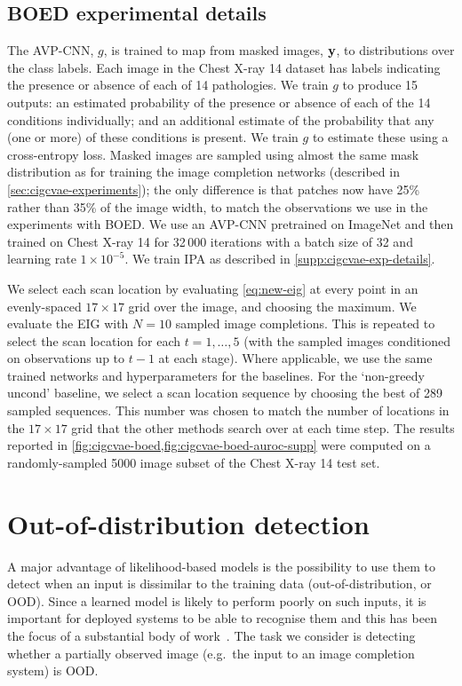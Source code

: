 \subsection{BOED experimental details}
The AVP-CNN, $g$, is trained to map from masked images, $\mathbf{y}{}$, to
distributions over the class labels. Each image in the Chest X-ray 14 dataset
has labels indicating the presence or absence of each of 14 pathologies. We
train $g$ to produce 15 outputs: an estimated probability of the presence or
absence of each of the 14 conditions individually; and an additional estimate of
the probability that any (one or more) of these conditions is present. We train
$g$ to estimate these using a cross-entropy loss. Masked images are sampled
using almost the same mask distribution as for training the image completion
networks (described in \cref{sec:cigcvae-experiments}); the only difference is that
patches now have 25\% rather than 35\% of the image width, to match the
observations we use in the experiments with BOED. We use an AVP-CNN pretrained
on ImageNet and then trained on Chest X-ray 14 for 32\,000 iterations with a
batch size of 32 and learning rate $1\times10^{-5}$. We train IPA as described
in \cref{supp:cigcvae-exp-details}.

We select each scan location by evaluating \cref{eq:new-eig} at every point in
an evenly-spaced $17\times17$ grid over the image, and choosing the maximum. We
evaluate the EIG with $N=10$ sampled image completions. This is repeated to
select the scan location for each $t=1,\ldots,5$ (with the sampled images
conditioned on observations up to $t-1$ at each stage). Where applicable, we use
the same trained networks and hyperparameters for the baselines. For the
`non-greedy uncond' baseline, we select a scan location sequence by choosing the
best of 289 sampled sequences. This number was chosen to match the number of
locations in the $17\times17$ grid that the other methods search over at each
time step. The results reported in \cref{fig:cigcvae-boed,fig:cigcvae-boed-auroc-supp} were
computed on a randomly-sampled 5000 image subset of the Chest X-ray 14 test set.


\section{Out-of-distribution detection} \label{supp:cigcvae-ood} A major advantage of
likelihood-based models is the possibility to use them to detect when an input
is dissimilar to the training data (out-of-distribution, or OOD). Since a
learned model is likely to perform poorly on such inputs, it is important for
deployed systems to be able to recognise them and this has been the focus of a
substantial body of
work~\citep{ren2019likelihood,hendrycks2016baseline,xiao2020likelihood,havtorn2021hierarchical}.
The task we consider is detecting whether a partially observed image (e.g.~the
input to an image completion system) is OOD.



